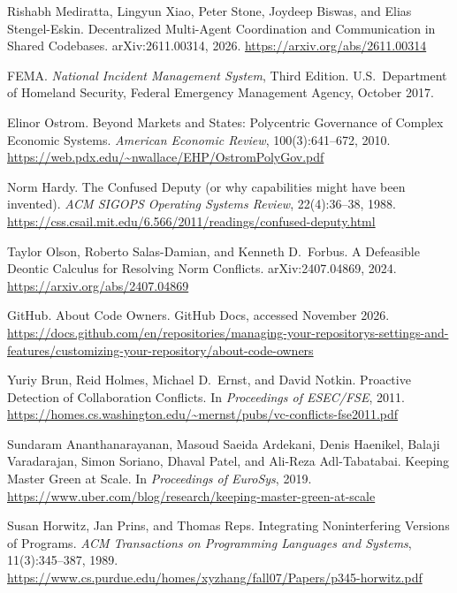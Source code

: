 Rishabh Mediratta, Lingyun Xiao, Peter Stone, Joydeep Biswas, and Elias Stengel-Eskin.
\newblock Decentralized Multi-Agent Coordination and Communication in Shared Codebases.
\newblock arXiv:2611.00314, 2026. \url{https://arxiv.org/abs/2611.00314}

FEMA.
\newblock \textit{National Incident Management System}, Third Edition.
\newblock U.S.\ Department of Homeland Security, Federal Emergency Management Agency, October 2017.

Elinor Ostrom.
\newblock Beyond Markets and States: Polycentric Governance of Complex Economic Systems.
\newblock \textit{American Economic Review}, 100(3):641--672, 2010.
\newblock \url{https://web.pdx.edu/~nwallace/EHP/OstromPolyGov.pdf}

Norm Hardy.
\newblock The Confused Deputy (or why capabilities might have been invented).
\newblock \textit{ACM SIGOPS Operating Systems Review}, 22(4):36--38, 1988.
\newblock \url{https://css.csail.mit.edu/6.566/2011/readings/confused-deputy.html}

Taylor Olson, Roberto Salas-Damian, and Kenneth D.\ Forbus.
\newblock A Defeasible Deontic Calculus for Resolving Norm Conflicts.
\newblock arXiv:2407.04869, 2024. \url{https://arxiv.org/abs/2407.04869}

GitHub.
\newblock About Code Owners.
\newblock GitHub Docs, accessed November 2026.
\newblock \url{https://docs.github.com/en/repositories/managing-your-repositorys-settings-and-features/customizing-your-repository/about-code-owners}

Yuriy Brun, Reid Holmes, Michael D.\ Ernst, and David Notkin.
\newblock Proactive Detection of Collaboration Conflicts.
\newblock In \textit{Proceedings of ESEC/FSE}, 2011.
\newblock \url{https://homes.cs.washington.edu/~mernst/pubs/vc-conflicts-fse2011.pdf}

Sundaram Ananthanarayanan, Masoud Saeida Ardekani, Denis Haenikel, Balaji Varadarajan, Simon Soriano, Dhaval Patel, and Ali-Reza Adl-Tabatabai.
\newblock Keeping Master Green at Scale.
\newblock In \textit{Proceedings of EuroSys}, 2019.
\newblock \url{https://www.uber.com/blog/research/keeping-master-green-at-scale}

Susan Horwitz, Jan Prins, and Thomas Reps.
\newblock Integrating Noninterfering Versions of Programs.
\newblock \textit{ACM Transactions on Programming Languages and Systems}, 11(3):345--387, 1989.
\newblock \url{https://www.cs.purdue.edu/homes/xyzhang/fall07/Papers/p345-horwitz.pdf}

